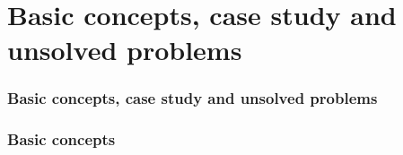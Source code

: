 \documentclass[aspectratio=169]{beamer}
\begin{document}
\section{Basic concepts, case study and unsolved problems}

\begin{frame}
    \frametitle{Basic concepts, case study and unsolved problems}
    \begin{figure}[ht]\centering
    \end{figure}
\end{frame}

\begin{frame}
    \frametitle{Basic concepts}
    \begin{figure}[ht]\centering
    \end{figure}
\end{frame}
\end{document}

